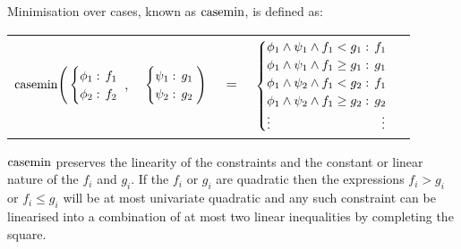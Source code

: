 Minimisation over cases, known as $\mathrm{casemin}$, is defined as:

{\footnotesize 
\abovedisplayskip=0pt
\belowdisplayskip=0pt
\begin{center}
  \begin{tabular}{r c c c l}
  \hspace{-7mm} 
  
  $\mathrm{casemin} \Bigg(
    \begin{cases}
        \phi_1: \hspace{-1mm} & \hspace{-1mm} f_1 \\ 
        \phi_2: \hspace{-1mm} & \hspace{-1mm} f_2 \\ 
    \end{cases}$
  $,$
  &
  \hspace{-4mm}
    $\begin{cases}
        \psi_1: \hspace{-1mm} & \hspace{-1mm} g_1 \\ 
        \psi_2: \hspace{-1mm} & \hspace{-1mm} g_2 \\ 
    \end{cases} \Bigg)$
  &
  \hspace{-4mm} 
  $ = $
  &
  \hspace{-4mm}
    $\begin{cases}
      \phi_1 \wedge \psi_1 \wedge f_1 < g_1    : & \hspace{-2mm} f_1 \\ 
      \phi_1 \wedge \psi_1 \wedge f_1 \geq g_1 : & \hspace{-2mm} g_1 \\ 
      \phi_1 \wedge \psi_2 \wedge f_1 < g_2    : & \hspace{-2mm} f_1 \\ 
      \phi_1 \wedge \psi_2 \wedge f_1 \geq g_2 : & \hspace{-2mm} g_2 \\ 
      \vdots & \vdots
    \end{cases}$
  \end{tabular}
\end{center}
}%

$\mathrm{casemin}$ preserves the linearity of the constraints and the constant 
or linear nature of the $f_i$ and $g_i$. If the $f_i$ or 
$g_i$ are quadratic then the expressions $f_i > g_i$ or 
$f_i \leq g_i$ will be at most univariate quadratic and any such 
constraint can be linearised into a combination of at most two linear 
inequalities by completing the square. 

